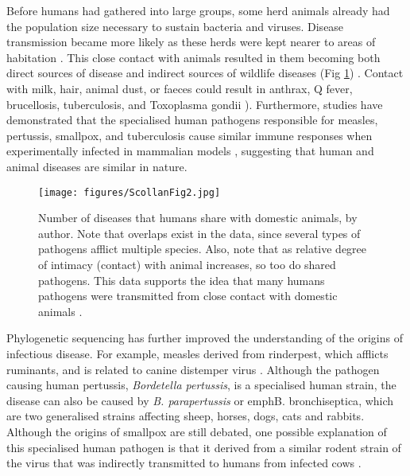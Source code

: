 Before humans had gathered into large groups, some herd animals already had the population size necessary to sustain bacteria and viruses. Disease transmission became more likely as these herds were kept nearer to areas of habitation \parencite[273]{Armelagos_1970}. 
This close contact with animals resulted in them becoming both direct sources of disease and indirect sources of wildlife diseases (Fig \ref{fig:ScollanFig2}) \parencites[370]{Pearce-Duvet_2006}[446]{Daszak_2000}. 
Contact with milk, hair, animal dust, or faeces could result in anthrax, Q fever, 
brucellosis, tuberculosis, and Toxoplasma gondii \parencites[273]{Armelagos_1970}[2750]{Sibley_2009}). 
Furthermore, studies have demonstrated that the specialised human pathogens responsible for measles, 
pertussis, smallpox, and tuberculosis cause similar immune responses when experimentally 
infected in mammalian models \parencites{Norrby_1985}{Arico_1987}, 
suggesting that human and animal diseases are similar in nature.

	\begin{figure}[!htb]
		\texttt{[image: figures/ScollanFig2.jpg]}
		\caption{Number of diseases that humans share with domestic animals, by author. Note that overlaps exist in the data, since several types of pathogens afflict multiple species. 
Also, note that as relative degree of intimacy (contact) with animal increases, so too do shared pathogens. This data supports the idea that many humans pathogens were transmitted from close contact with domestic animals \parencites{McNeill_1976}{Hull_1963}.}
		\label{fig:ScollanFig2} %
	\end{figure}
Phylogenetic sequencing has further improved the understanding of the origins of infectious disease. For example, measles derived from rinderpest, which afflicts ruminants, and is related to canine distemper virus 
\parencite{Westover_2001}. Although the pathogen causing human pertussis, \emph{Bordetella pertussis}, is a specialised human strain, the disease can also be caused by \emph{B. parapertussis} or emph{B. bronchiseptica}, 
which are two generalised strains affecting sheep, horses, dogs, cats and rabbits\parencite[259]{Porter_1994}. 
Although the origins of smallpox are still debated, 
one possible explanation of this specialised human pathogen 
is that it derived from a similar rodent strain of the virus that was 
indirectly transmitted to humans from infected cows \parencites{Pulford_2002}[115--116]{Gubser_2004}. 

